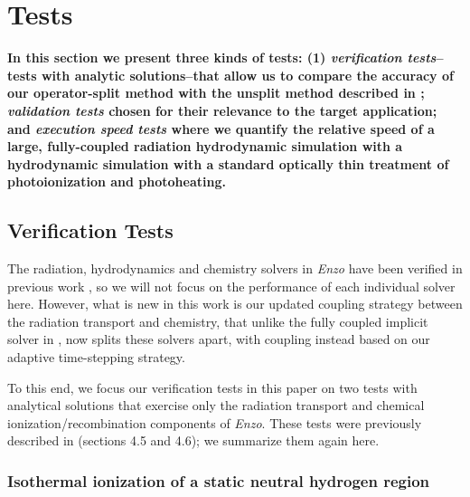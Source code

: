 \section{Tests}
\label{sec:tests}

{\bf In this section we present three kinds of tests: (1) {\em verification tests}--tests with analytic solutions--that allow us to compare the accuracy of our operator-split method with the unsplit method described in \cite{ReynoldsHayesPaschosNorman2009}; {\em validation tests} chosen for their relevance to the target application; and {\em execution speed tests} where we quantify the relative speed of a large, fully-coupled radiation hydrodynamic simulation with a hydrodynamic simulation with a standard optically thin treatment of photoionization and photoheating. }

\subsection{Verification Tests}
\label{subsec:verification}

The radiation, hydrodynamics and chemistry solvers in {\em Enzo} have been
verified in previous work \citep{ReynoldsHayesPaschosNorman2009}, so we
will not focus on the performance of each individual solver here.
However, what is new in this work is our updated coupling strategy
between the radiation transport and chemistry, that unlike the fully
coupled implicit solver in
\cite{NormanEtAl2007,ReynoldsHayesPaschosNorman2009,NormanReynoldsSo2009},
now splits these solvers apart, with coupling instead based on our
adaptive time-stepping strategy.  

To this end, we focus our verification tests in this paper on two
tests with analytical solutions that exercise only the radiation
transport and chemical ionization/recombination components of {\em Enzo}.
These tests were previously described in
\cite{ReynoldsHayesPaschosNorman2009} (sections 4.5 and 4.6); we
summarize them again here.


\subsubsection{Isothermal ionization of a static neutral hydrogen region}
\label{subsec:test1}

